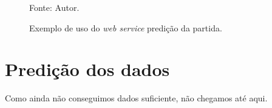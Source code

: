 \begin{figure}[H]
	
	\centering
	\caption{Exemplo de uso do \textit{web service} predição da partida.}
	\qquad


	\small{Fonte: Autor.}
	\label{fig:web_service_predict}
\end{figure}

\section{Predição dos dados}
\label{chap:pred}
Como ainda não conseguimos dados suficiente, não chegamos até aqui.